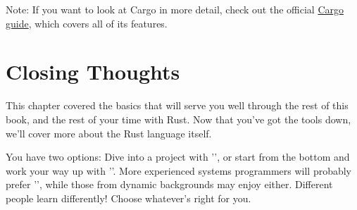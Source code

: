 \begin{myquote}
Note: If you want to look at Cargo in more detail, check out the official \href{http://doc.crates.io/guide.html}{Cargo guide}, 
which covers all of its features.
\end{myquote}

\section{Closing Thoughts}

This chapter covered the basics that will serve you well through the rest of this book, and the rest of your time with Rust. 
Now that you've got the tools down, we'll cover more about the Rust language itself.

\blank

You have two options: Dive into a project with '', or start from the bottom and work your way up with 
''. More experienced systems programmers will probably prefer '', while those from 
dynamic backgrounds may enjoy either. Different people learn differently! Choose whatever's right for you.
